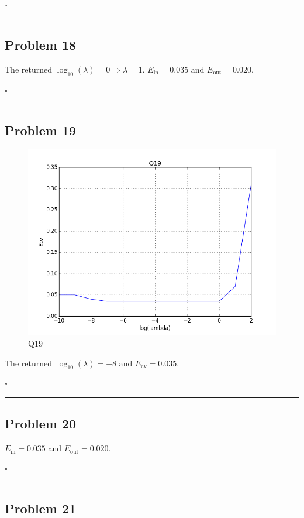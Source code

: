 \documentclass[12pt]{article}
\newcommand*{\QEDB}{\hfill\ensuremath{\square}}
\newcommand{\ParTh}[1]{\left(#1\right)}
\newcommand{\horrule}[1]{\rule{\linewidth}{#1}}
\begin{document}
\QEDB

\horrule{0.5pt}

\subsection*{Problem 18}

The returned $\log_{10}\ParTh{\lambda}=0\Rightarrow\lambda=1$. $E_{\text{in}}=0.035$ and $E_{\text{out}}=0.020$.

\QEDB

\horrule{0.5pt}

\subsection*{Problem 19}

\begin{figure}[h]
	\centering
	\includegraphics[scale=0.3]{Q19.png}
	\caption{Q19}
	\label{Q19}
\end{figure}
The returned $\log_{10}\ParTh{\lambda}=-8$ and $E_{\text{cv}}=0.035$.

\QEDB

\horrule{0.5pt}

\subsection*{Problem 20}

$E_{\text{in}}=0.035$ and $E_{\text{out}}=0.020$.

\QEDB

\horrule{0.5pt}

\subsection*{Problem 21}
\end{document}
